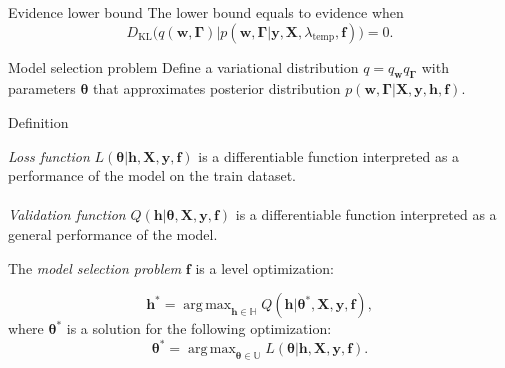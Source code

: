 \documentclass[usenames,dvipsnames,11pt,pdf,utf8,russian,aspectratio=43]{beamer}
\DeclareMathOperator*{\argmax}{arg\,max}
\begin{document}
\begin{frame}{Evidence lower bound}
The lower bound equals to evidence when $$D_\text{KL}\bigl(q(\mathbf{w}, \boldsymbol{\Gamma})|p\left(\mathbf{w}, \boldsymbol{\Gamma}|\mathbf{y}, \mathbf{X}, \lambda_\text{temp},\mathbf{f}\right)\bigr)=0.$$

\end{frame}      


\begin{frame}{Model selection problem}
\footnotesize
Define a variational distribution $q=q_\mathbf{w}q_{\boldsymbol{\Gamma}}$ with parameters $\boldsymbol{\theta}$ that approximates posterior distribution $p(\mathbf{w}, \boldsymbol{\Gamma}|\mathbf{X}, \mathbf{y}, \mathbf{h}, \mathbf{f})$.



\begin{block}{Definition}

\textit{Loss function} $L( \boldsymbol{\theta}| \mathbf{h}, \mathbf{X}, \mathbf{y}, \mathbf{f})$ is a differentiable function interpreted as a performance of the model on the train dataset.~\\~\\
\textit{Validation function} $Q(\mathbf{h}| \boldsymbol{\theta}, \mathbf{X}, \mathbf{y}, \mathbf{f} )$  is a differentiable function  interpreted as a general performance of the model.
\end{block}
\begin{block}{}
The \textit{model selection problem} $\mathbf{f}$ is a level optimization:

\[
	\mathbf{h}^{*} = \argmax_{\mathbf{h} \in \mathbb{H}} Q(\mathbf{h}|  \boldsymbol{\theta}^{*}, \mathbf{X}, \mathbf{y}, \mathbf{f} ),
\]
where $\boldsymbol{\theta}^{*}$ is a solution for the following optimization:
\[
   \boldsymbol{\theta}^{*} = \argmax_{\boldsymbol{\theta} \in \mathbb{U}} L(\boldsymbol{\theta}|  \mathbf{h},  \mathbf{X}, \mathbf{y}, \mathbf{f}).
\]
\end{block}


\end{frame}







                                                                                                              
\end{document}
